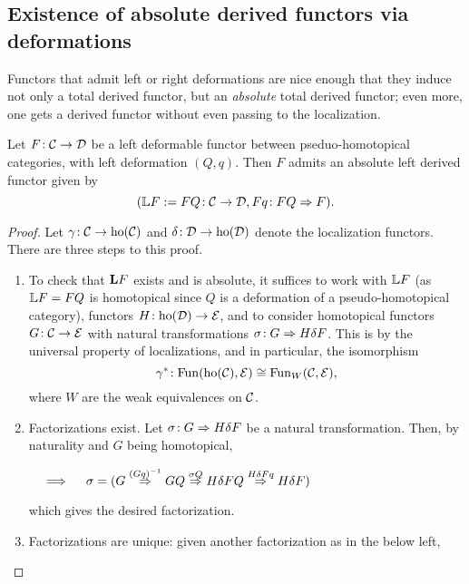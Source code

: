 \subsection{Existence of absolute derived functors via deformations}
Functors that admit left or right deformations are nice enough that they induce not only a total derived functor, but an \emph{absolute} total derived functor; even more,
one gets a derived functor without even passing to the localization.
\begin{theorem}
	Let \(F\!:\mathcal{C}\to\mathcal{D}\) be a left deformable functor between pseduo-homotopical categories, with left deformation \((Q,q)\). Then \(F\) admits an absolute left derived functor
	given by
	\[ (\mathbb{L} F := FQ\!:\mathcal{C}\to\mathcal{D}, F q\!: FQ\Rightarrow F). \]
\end{theorem}
\begin{proof}
Let \(\gamma\!:\mathcal{C}\to\operatorname{ho}(\mathcal{C})\) and \(\delta\!:\mathcal{D}\to\operatorname{ho}(\mathcal{D})\) denote the localization functors. There are three steps to this proof.
\begin{enumerate}[label=(\arabic*)]
\item To check that \(\mathbf{L} F\) exists and is absolute, it suffices to work with \(\mathbb{L} F\) (as \(\mathbb{L} F = FQ\) is homotopical since \(Q\) is a deformation of a pseudo-homotopical category),
functors \(H\!:\operatorname{ho}(\mathcal{D})\to\mathcal{E}\), and to consider homotopical functors \(G\!:\mathcal{C}\to\mathcal{E}\) with natural transformations \(\sigma\!:G\Rightarrow H\delta F\). This is by the universal property of localizations, and in
particular, the isomorphism
\[\gamma^*\!:\operatorname{Fun}(\operatorname{ho}(\mathcal{C}),\mathcal{E})\cong\operatorname{Fun}_W(\mathcal{C},\mathcal{E}),\]
where \(W\) are the weak equivalences on \(\mathcal{C}\).
\item Factorizations exist. Let \(\sigma\!:G\Rightarrow H\delta F\) be a natural transformation. Then, by naturality and \(G\) being homotopical,
\begin{center}
	\(\quad\implies\quad \sigma = (G\overset{(Gq)^{-1}}{\Rightarrow} GQ\overset{\sigma Q}{\Rightarrow} H\delta FQ\overset{H\delta Fq}{\Rightarrow} H\delta F)\)
\end{center}
which gives the desired factorization.
\item Factorizations are unique: given another factorization as in the below left,
\begin{center}

\end{center}
\end{enumerate}
\end{proof}
